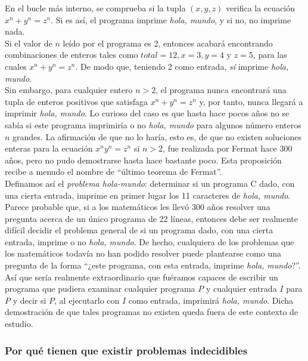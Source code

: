 En el bucle más interno, se comprueba si la tupla $(x,y,z)$ verifica la ecuación $x^n + y^n = z^n$. Si es así, el programa imprime \emph{hola, mundo}, y si no, no imprime nada.\\

Si el valor de $n$ leído por el programa es 2, entonces acabará encontrando combinaciones de enteros tales como $total = 12, x = 3, y = 4$ y $z = 5$, para las cuales $x^n + y^n = z^n$. De modo que, teniendo 2 como entrada, \emph{sí} imprime \emph{hola, mundo}.\\

Sin embargo, para cualquier entero $n > 2$, el programa nunca encontrará una tupla de enteros positivos que satisfaga $x^n + y^n = z^n$ y, por tanto, nunca llegará a imprimir \emph{hola, mundo}. Lo curioso del caso es que hasta hace pocos años no se sabía si este programa imprimiría o no \emph{hola, mundo} para algunos número enteros $n$ grandes. La afirmación de que no lo haría, esto es, de que no existen soluciones enteras para la ecuación $x^n y^n = z^n$ si $n > 2$, fue realizada por Fermat hace 300 años, pero no pudo demostrarse hasta hace bastante poco. Esta proposición recibe a menudo el nombre de ``último teorema de Fermat''.\\

Definamos así el \emph{problema hola-mundo}: determinar si un programa C dado, con una cierta entrada, imprime en primer lugar los 11 caracteres de \emph{hola, mundo}. \\

Parece probable que, si a los matemáticos les llevó 300 años resolver una pregunta acerca de un único programa de 22 líneas, entonces debe ser realmente difícil decidir el problema general de si un programa dado, con una cierta entrada, imprime o no \emph{hola, mundo}. De hecho, cualquiera de los problemas que los matemáticos todavía no han podido resolver puede plantearse como una pregunta de la forma ``¿este programa, con esta entrada, imprime \emph{hola, mundo}?''. Así que sería realmente extraordinario que fuéramos capaces de escribir un programa que pudiera examinar cualquier programa $P$ y cualquier entrada $I$ para $P$ y decir si $P$, al ejecutarlo con $I$ como entrada, imprimirá \emph{hola, mundo}. Dicha demostración de que tales programas no existen queda fuera de este contexto de estudio.\\

\subsubsection{Por qué tienen que existir problemas indecidibles}

